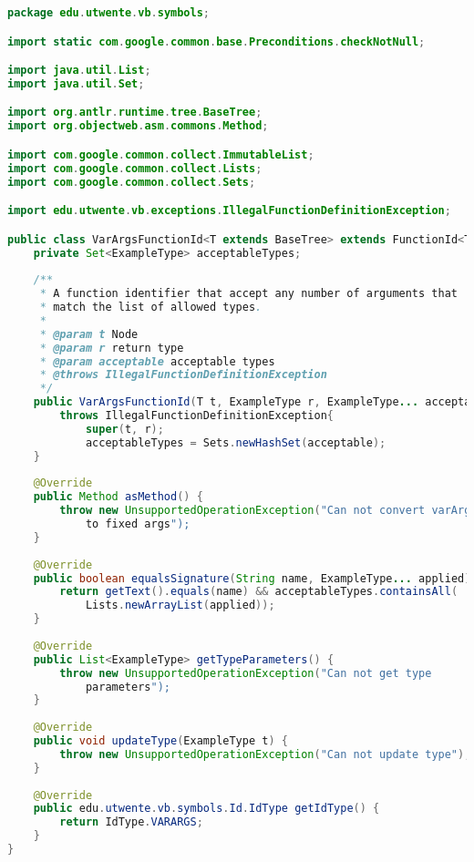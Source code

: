 \begin{lstlisting}[language=Java]
package edu.utwente.vb.symbols;

import static com.google.common.base.Preconditions.checkNotNull;

import java.util.List;
import java.util.Set;

import org.antlr.runtime.tree.BaseTree;
import org.objectweb.asm.commons.Method;

import com.google.common.collect.ImmutableList;
import com.google.common.collect.Lists;
import com.google.common.collect.Sets;

import edu.utwente.vb.exceptions.IllegalFunctionDefinitionException;

public class VarArgsFunctionId<T extends BaseTree> extends FunctionId<T>{
	private Set<ExampleType> acceptableTypes;
	
	/**
	 * A function identifier that accept any number of arguments that 
     * match the list of allowed types.
	 * 
	 * @param t Node
	 * @param r return type
	 * @param acceptable acceptable types
	 * @throws IllegalFunctionDefinitionException 
	 */
	public VarArgsFunctionId(T t, ExampleType r, ExampleType... acceptable) 
        throws IllegalFunctionDefinitionException{
    		super(t, r);
    		acceptableTypes = Sets.newHashSet(acceptable);
	}
	
	@Override
	public Method asMethod() {
		throw new UnsupportedOperationException("Can not convert varArgs 
            to fixed args");
	}
	
	@Override
	public boolean equalsSignature(String name, ExampleType... applied) {
		return getText().equals(name) && acceptableTypes.containsAll(
            Lists.newArrayList(applied));
	}
	
	@Override
	public List<ExampleType> getTypeParameters() {
		throw new UnsupportedOperationException("Can not get type 
            parameters");
	}
	
	@Override
	public void updateType(ExampleType t) {
		throw new UnsupportedOperationException("Can not update type");
	}	
	
	@Override
	public edu.utwente.vb.symbols.Id.IdType getIdType() {
		return IdType.VARARGS;
	}
}

\end{lstlisting}
